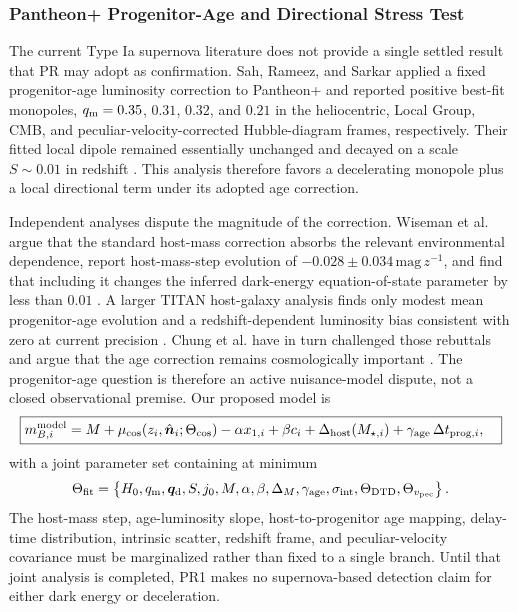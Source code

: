\documentclass[11pt]{article}
\begin{document}
\subsubsection{Pantheon+ Progenitor-Age and Directional Stress Test}
\label{sec:pantheon_phase_stress_test}

The current Type Ia supernova literature does not provide a single settled result that PR may adopt as confirmation. Sah, Rameez, and Sarkar applied a fixed progenitor-age luminosity correction to Pantheon+ and reported positive best-fit monopoles, \(q_{\rm m}=0.35\), \(0.31\), \(0.32\), and \(0.21\) in the heliocentric, Local Group, CMB, and peculiar-velocity-corrected Hubble-diagram frames, respectively. Their fitted local dipole remained essentially unchanged and decayed on a scale \(S\sim0.01\) in redshift \cite{Sah2026PantheonAge}. This analysis therefore favors a decelerating monopole plus a local directional term under its adopted age correction.

Independent analyses dispute the magnitude of the correction. Wiseman et al. argue that the standard host-mass correction absorbs the relevant environmental dependence, report host-mass-step evolution of \(-0.028\pm0.034\,\mathrm{mag}\,z^{-1}\), and find that including it changes the inferred dark-energy equation-of-state parameter by less than \(0.01\) \cite{Wiseman2026StillAccelerating}. A larger TITAN host-galaxy analysis finds only modest mean progenitor-age evolution and a redshift-dependent luminosity bias consistent with zero at current precision \cite{Murakami2026OldUniverse}. Chung et al. have in turn challenged those rebuttals and argue that the age correction remains cosmologically important \cite{Chung2026StillNonAccelerating}. The progenitor-age question is therefore an active nuisance-model dispute, not a closed observational premise. Our proposed model is
\begin{equation}
\boxed{
\begin{aligned}
m_{B,i}^{\rm model}
={}&
M
+
\mu_{\rm cos}
\!\left(z_i,\hat{\bm n}_i;\Theta_{\rm cos}\right)
-
\alpha x_{1,i}
+
\beta c_i
+
\Delta_{\rm host}(M_{\star,i})
+
\gamma_{\rm age}\,\Delta t_{{\rm prog},i},
\end{aligned}
}
\end{equation}
with a joint parameter set containing at minimum
\begin{equation}
\Theta_{\rm fit}
=
\left\{
H_0,
q_{\rm m},
\bm q_{\rm d},
S,
j_0,
M,
\alpha,
\beta,
\Delta_M,
\gamma_{\rm age},
\sigma_{\rm int},
\Theta_{\rm DTD},
\Theta_{v_{\rm pec}}
\right\}.
\end{equation}
The host-mass step, age-luminosity slope, host-to-progenitor age mapping, delay-time distribution, intrinsic scatter, redshift frame, and peculiar-velocity covariance must be marginalized rather than fixed to a single branch. Until that joint analysis is completed, PR1 makes no supernova-based detection claim for either dark energy or deceleration.
\end{document}
